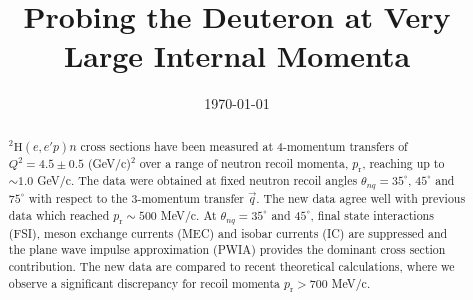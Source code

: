 \documentclass[aps,prl,twocolumn,showpacs,superscriptaddress,groupedaddress]{revtex4-2}  %
\begin{document}
\title{Probing the Deuteron at Very Large Internal Momenta}



\date{\today}

\begin{abstract}
  $^{2}\mathrm{H}(e,e'p)n$ cross sections have been measured at 4-momentum transfers of $Q^{2} = 4.5 \pm 0.5$ (GeV/c)$^{2}$
  over a range of neutron recoil momenta, $p_{\mathrm{r}}$,  reaching up to $\sim1.0$ GeV/c. The data were
  obtained at fixed neutron recoil angles $\theta_{nq} = 35^\circ$, $45^\circ$ and $75^{\circ}$  with respect to the 3-momentum
  transfer $\vec q$. The new data agree well with previous data which reached $p_{\mathrm{r}}\sim500$ MeV/c. At $\theta_{nq} = 35^\circ$
  and $45^\circ$, final state interactions (FSI), meson exchange currents (MEC) and isobar currents (IC) are suppressed and
  the plane wave impulse approximation (PWIA) provides the dominant cross section contribution. The new data are compared to recent
  theoretical calculations, where we observe a significant discrepancy for recoil momenta $p_{\mathrm{r}}>700$ MeV/c. 
\end{abstract}

\maketitle
\end{document}
